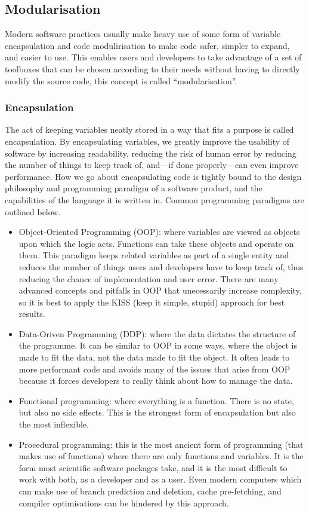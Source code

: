 \subsection{Modularisation}

Modern software practices usually make heavy use of some form of variable encapsulation and code modulirisation to make code safer, simpler to expand, and easier to use. This enables users and developers to take advantage of a set of toolboxes that can be chosen according to their needs without having to directly modify the source code, this concept is called ``modularisation''.

\subsubsection{Encapsulation}\label{ss:encapsulation}

The act of keeping variables neatly stored in a way that fits a purpose is called encapsulation. By encapsulating variables, we greatly improve the usability of software by increasing readability, reducing the risk of human error by reducing the number of things to keep track of, and---if done properly---can even improve performance. How we go about encapsulating code is tightly bound to the design philosophy and programming paradigm of a software product, and the capabilities of the language it is written in. Common programming paradigms are outlined below.
\begin{itemize}
    \item Object-Oriented Programming (OOP): where variables are viewed as objects upon which the logic acts. Functions can take these objects and operate on them. This paradigm keeps related variables as part of a single entity and reduces the number of things users and developers have to keep track of, thus reducing the chance of implementation and user error. There are many advanced concepts and pitfalls in OOP that unecessarily increase complexity, so it is best to apply the KISS (keep it simple, stupid) approach for best results.
    \item Data-Oriven Programming (DDP): where the data dictates the structure of the programme. It can be similar to OOP in some ways, where the object is made to fit the data, not the data made to fit the object. It often leads to more performant code and avoids many of the issues that arise from OOP because it forces developers to really think about how to manage the data.
    \item Functional programming: where everything is a function. There is no state, but also no side effects. This is the strongest form of encapsulation but also the most inflexible.
    \item Procedural programming: this is the most ancient form of programming (that makes use of functions) where there are only functions and variables. It is the form most scientific software packages take, and it is the most difficult to work with both, as a developer and as a user. Even modern computers which can make use of branch prediction and deletion, cache pre-fetching, and compiler optimisations can be hindered by this approach.
\end{itemize}

